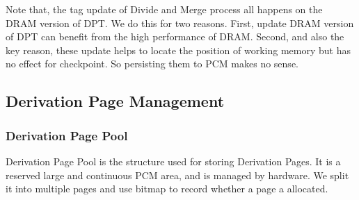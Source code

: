 \documentclass[conference]{IEEEtran}
\begin{document}

Note that, the tag update of Divide and Merge process all happens on the DRAM version of DPT\@.
We do this for two reasons.
First, update DRAM version of DPT can benefit from the high performance of DRAM\@.
Second, and also the key reason, these update helps to locate the position of working memory but has no effect for checkpoint.
So persisting them to PCM makes no sense.

\subsection{Derivation Page Management}\label{sec:page_pool}

\subsubsection{Derivation Page Pool}



Derivation Page Pool is the structure used for storing Derivation Pages.
It is a reserved large and continuous PCM area, and is managed by hardware.
We split it into multiple pages and use bitmap to record whether a page a allocated.



\end{document}
